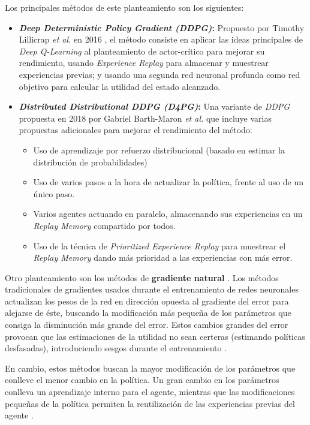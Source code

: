 Los principales métodos de este planteamiento son los siguientes:
\begin{itemize}
	\item \textbf{\textit{Deep Deterministic Policy Gradient (DDPG)}:} Propuesto por Timothy Lillicrap \textit{et al.} en 2016 \cite{journals/corr/LillicrapHPHETS15}, el método consiste en aplicar las ideas principales de \textit{Deep Q-Learning} al planteamiento de actor-crítico para mejorar su rendimiento, usando \textit{Experience Replay} para almacenar y muestrear experiencias previas; y usando una segunda red neuronal profunda como red objetivo para calcular la utilidad del estado alcanzado.
	\item \textbf{\textit{Distributed Distributional DDPG (D4PG)}:} Una variante de \textit{DDPG} propuesta en 2018 por Gabriel Barth-Maron \textit{et al.} \cite{DBLP:journals/corr/abs-1804-08617} que incluye varias propuestas adicionales para mejorar el rendimiento del método:
	\begin{itemize}
		\item Uso de aprendizaje por refuerzo distribucional (basado en estimar la distribución de probabilidades)
		\item Uso de varios pasos a la hora de actualizar la política, frente al uso de un único paso.
		\item Varios agentes actuando en paralelo, almacenando sus experiencias en un \textit{Replay Memory} compartido por todos.
		\item Uso de la técnica de \textit{Prioritized Experience Replay} para muestrear el \textit{Replay Memory} dando más prioridad a las experiencias con más error.
	\end{itemize}
\end{itemize}

Otro planteamiento son los métodos de \textbf{gradiente natural} \cite{PETERS2008682}. Los métodos tradicionales de gradientes usados durante el entrenamiento de redes neuronales actualizan los pesos de la red en dirección opuesta al gradiente del error para alejarse de éste, buscando la modificación más pequeña de los parámetros que consiga la disminución más grande del error. Estos cambios grandes del error provocan que las estimaciones de la utilidad no sean certeras (estimando políticas desfasadas), introduciendo sesgos durante el entrenamiento \cite{vitay_2020}.

En cambio, estos métodos buscan la mayor modificación de los parámetros que conlleve el menor cambio en la política. Un gran cambio en los parámetros conlleva un aprendizaje interno para el agente, mientras que las modificaciones pequeñas de la política permiten la reutilización de las experiencias previas del agente \cite{vitay_2020}.

